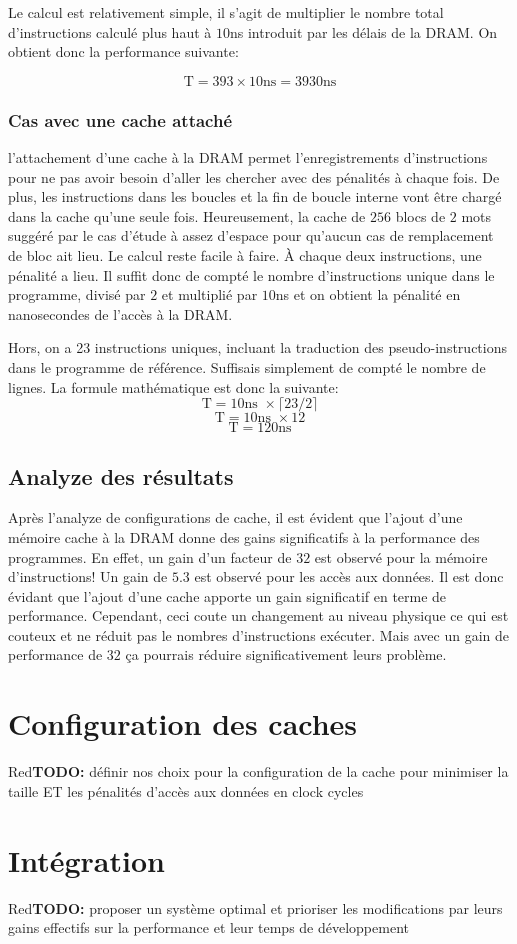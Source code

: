 \documentclass[a11paper]{article}
\newcommand{\todo}[1]{\begin{color}{Red}\textbf{TODO:} #1\end{color}}
\begin{document}
Le calcul est relativement simple, il s'agit de multiplier le nombre total
d'instructions calculé plus haut à $10$ns introduit par les délais de la
DRAM. On obtient donc la performance suivante:

\begin{equation}
  \text{T}=393\times10\text{ns}=3930\text{ns}
\end{equation}

\subsubsection{Cas avec une cache attaché}
l'attachement d'une cache à la DRAM permet l'enregistrements d'instructions pour ne pas avoir besoin d'aller les chercher avec des pénalités à chaque fois.
De plus, les instructions dans les boucles et la fin de boucle interne vont être chargé dans la cache qu'une seule fois. Heureusement, la cache de $256$ blocs de
$2$ mots suggéré par le cas d'étude à assez d'espace pour qu'aucun cas de remplacement de bloc ait lieu.
Le calcul reste facile à faire. À chaque deux instructions, une pénalité a lieu. Il suffit donc de compté le nombre d'instructions unique dans le programme, divisé
par $2$ et multiplié par $10$ns et on obtient la pénalité en nanosecondes de l'accès à la DRAM.

Hors, on a 23 instructions uniques, incluant la traduction des pseudo-instructions dans le programme de référence. Suffisais simplement de compté le nombre de
lignes. La formule mathématique est donc la suivante:
$$
\text{T} = 10\text{ns }\times\lceil23/2\rceil
$$
$$
\text{T} = 10\text{ns }\times12
$$
$$
\text{T} = 120\text{ns}
$$

\subsection{Analyze des résultats}
Après l'analyze de configurations de cache, il est évident que l'ajout d'une mémoire cache à la DRAM donne des gains significatifs à la performance des programmes.
En effet, un gain d'un facteur de $32$ est observé pour la mémoire d'instructions! Un gain de $5.3$ est observé pour les accès aux données. Il est donc évidant que
l'ajout d'une cache apporte un gain significatif en terme de performance. Cependant, ceci coute un changement au niveau physique ce qui est couteux et ne réduit pas
le nombres d'instructions exécuter. Mais avec un gain de performance de $32$ ça pourrais réduire significativement leurs problème.

\section{Configuration des caches}

\todo{définir nos choix pour la configuration de la cache pour minimiser la
taille ET les pénalités d'accès aux données en clock cycles}

\section{Intégration}

\todo{proposer un système optimal et prioriser les modifications par leurs
gains effectifs sur la performance et leur temps de développement}
\end{document}
